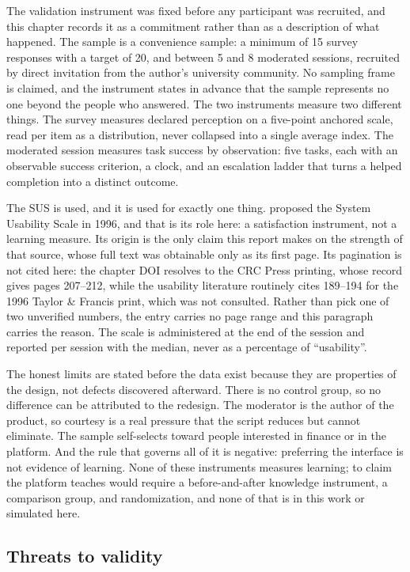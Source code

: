 The validation instrument was fixed before any participant was recruited, and
this chapter records it as a commitment rather than as a description of what
happened. The sample is a convenience sample: a minimum of 15 survey responses
with a target of 20, and between 5 and 8 moderated sessions, recruited by
direct invitation from the author's university community. No sampling frame is
claimed, and the instrument states in advance that the sample represents no one
beyond the people who answered. The two instruments measure two different
things. The survey measures declared perception on a five-point anchored scale,
read per item as a distribution, never collapsed into a single average index.
The moderated session measures task success by observation: five tasks, each
with an observable success criterion, a clock, and an escalation ladder that
turns a helped completion into a distinct outcome.

The SUS is used, and it is used for exactly one thing. \parencite{brooke1996sus}
proposed the System Usability Scale in 1996, and that is its role here: a
satisfaction instrument, not a learning measure. Its origin is the only claim
this report makes on the strength of that source, whose full text was
obtainable only as its first page. Its pagination is not cited here: the
chapter DOI resolves to the CRC Press printing, whose record gives pages
207--212, while the usability literature routinely cites 189--194 for the 1996
Taylor \& Francis print, which was not consulted. Rather than pick one of two
unverified numbers, the entry carries no page range and this paragraph carries
the reason. The scale is
administered at the end of the session and reported per session with the
median, never as a percentage of \enquote{usability}.

The honest limits are stated before the data exist because they are properties
of the design, not defects discovered afterward. There is no control group, so
no difference can be attributed to the redesign. The moderator is the author of
the product, so courtesy is a real pressure that the script reduces but cannot
eliminate. The sample self-selects toward people interested in finance or in
the platform. And the rule that governs all of it is negative: preferring the
interface is not evidence of learning. None of these instruments measures
learning; to claim the platform teaches would require a before-and-after
knowledge instrument, a comparison group, and randomization, and none of that
is in this work or simulated here.

\subsection{Threats to validity}

